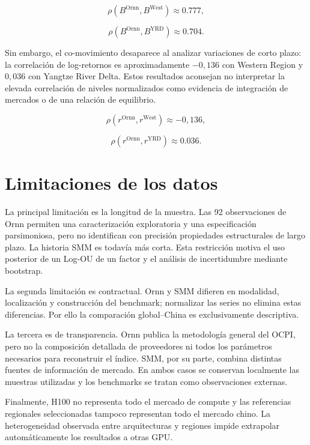 \begin{equation}
\rho(B^{\mathrm{Ornn}},B^{\mathrm{West}})\approx0.777,
\label{eq:corr_base100_west}
\end{equation}

\begin{equation}
\rho(B^{\mathrm{Ornn}},B^{\mathrm{YRD}})\approx0.704.
\label{eq:corr_base100_yrd}
\end{equation}

Sin embargo, el co-movimiento desaparece al analizar variaciones de corto plazo:
la correlación de log-retornos es aproximadamente $-0{,}136$ con Western Region
y $0{,}036$ con Yangtze River Delta. Estos resultados aconsejan no interpretar
la elevada correlación de niveles normalizados como evidencia de integración de
mercados o de una relación de equilibrio.

\begin{equation}
\rho(r^{\mathrm{Ornn}},r^{\mathrm{West}})\approx-0{,}136,
\label{eq:corr_returns_west}
\end{equation}

\begin{equation}
\rho(r^{\mathrm{Ornn}},r^{\mathrm{YRD}})\approx 0.036.
\label{eq:corr_returns_yrd}
\end{equation}

\section{Limitaciones de los datos}
\label{sec:limitaciones_datos}

La principal limitación es la longitud de la muestra. Las 92 observaciones de
Ornn permiten una caracterización exploratoria y una especificación parsimoniosa,
pero no identifican con precisión propiedades estructurales de largo plazo. La
historia SMM es todavía más corta. Esta restricción motiva el uso posterior de un
Log-OU de un factor y el análisis de incertidumbre mediante bootstrap.

La segunda limitación es contractual. Ornn y SMM difieren en modalidad,
localización y construcción del benchmark; normalizar las series no elimina estas
diferencias. Por ello la comparación global--China es exclusivamente descriptiva.

La tercera es de transparencia. Ornn publica la metodología general del OCPI, pero
no la composición detallada de proveedores ni todos los parámetros necesarios para
reconstruir el índice. SMM, por su parte, combina distintas fuentes de información
de mercado. En ambos casos se conservan localmente las muestras utilizadas y los
benchmarks se tratan como observaciones externas.

Finalmente, H100 no representa todo el mercado de compute y las referencias
regionales seleccionadas tampoco representan todo el mercado chino. La
heterogeneidad observada entre arquitecturas y regiones impide extrapolar
automáticamente los resultados a otras GPU.

